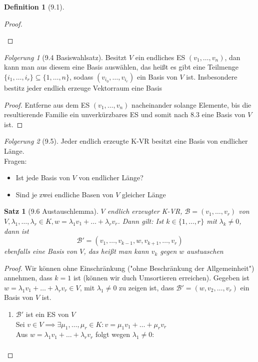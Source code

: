 \documentclass[a4paper]{scrartcl}
\DeclareMathOperator{\Exists}{\exists}
\theoremstyle{definition}
\newtheorem{defn}{Definition}
\theoremstyle{plain}
\newtheorem{thm}{Satz}
\theoremstyle{plain}
\theoremstyle{remark}
\theoremstyle{remark}
\theoremstyle{remark}
\newtheorem{conc}{Folgerung}
\theoremstyle{remark}
\theoremstyle{remark}
\begin{document}
\begin{defn}[9.1]
\begin{proof}
\begin{enumerate}
\end{enumerate}
\end{proof}
\begin{conc}[9.4 Basiswahlsatz]
Besitzt $V$ ein endliches ES $(v_1, \ldots, v_n)$, dan kann man aus diesem eine Basis auswählen, das heißt es gibt eine Teilmenge $\{i_1, \ldots, i_r\} \subseteq \{1, \ldots, n\}$, sodass $(v_{i_0}, \ldots, v_{i_r})$ ein Basis von $V$ ist. Insbesondere bestitz jeder endlich erzeuge Vektorraum eine Basis
\end{conc}
\begin{proof}
Entferne aus dem ES $(v_1, \ldots, v_n)$ nacheinander solange Elemente, bis die resultierende Familie ein unverkürzbares ES und somit nach 8.3 eine Basis von $V$ ist.
\end{proof}
\begin{conc}[9.5]
Jeder endlich erzeugte K-VR besitzt eine Basis von endlicher Länge. \\
  Fragen:
\begin{itemize}
\item Ist jede Basis von $V$ von endlicher Länge?
\item Sind je zwei endliche Basen von $V$ gleicher Länge
\end{itemize}
\end{conc}
\begin{thm}[9.6 Austauschlemma]
$V$ endlich erzeugter K-VR, $\mathcal{B} = (v_1, \ldots, v_r)$ von $V,\lambda_1, \ldots,\lambda_r \in K,w = \lambda_1 v_1 + \ldots + \lambda_r v_r$. Dann gilt:
Ist $k\in \{1,\ldots, r\}$ mit $\lambda_k \neq 0$, dann ist
\[\mathcal{B}' = (v_1, \ldots, v_{k - 1}, w, v_{k + 1}, \ldots, v_r)\]
ebenfalls eine Basis von $V$, das heißt man kann $v_k$ gegen $w$ austuaschen
\end{thm}
\begin{proof}
Wir können ohne Einschränkung ("ohne Beschränkung der Allgemeinheit") annehmen, dass $k = 1$ ist (können wir duch Umsortieren erreichen). Gegeben ist $w = \lambda_1 v_1 + \ldots + \lambda_r v_r \in V$, mit $\lambda_1 \neq 0$
zu zeigen ist, dass $\mathcal{B}' = (w, v_2, \ldots, v_r)$ ein Basis von $V$ ist.
\begin{enumerate}
\item $\mathcal{B}'$ ist ein ES von $V$ \\
     Sei $v\in V \implies \Exists \mu_1, \ldots, \mu_r \in K: v = \mu_1 v_1 + \ldots + \mu_r v_r$ \\
     Aus $w = \lambda_1 v_1 + \ldots + \lambda_r v_r$ folgt wegen $\lambda_1 \neq 0$:
\begin{align*}

\end{align*}
\end{enumerate}
\end{proof}
\end{defn}
\end{document}
